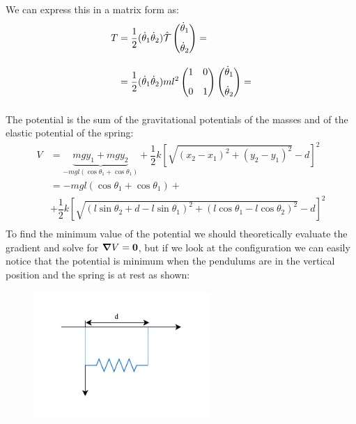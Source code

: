 We can express this in a matrix form as:
\begin{equation}
    \begin{split}
        T &= \dfrac{1}{2}(\dot{\theta}_1 \dot{\theta}_2)\hat{\mathcal{T}}\begin{pmatrix}
            \dot{\theta}_1 \\[8pt]\dot{\theta}_2
        \end{pmatrix} = \\[8pt]
        &= \dfrac{1}{2}(\dot{\theta}_1 \dot{\theta}_2)ml^2\begin{pmatrix}
            1 & 0\\[8pt]
            0 & 1
        \end{pmatrix}
        \begin{pmatrix}
            \dot{\theta}_1 \\[8pt]\dot{\theta}_2
        \end{pmatrix} = \\[8pt]
    \end{split}
\end{equation}
The potential is the sum of the gravitational potentials of the masses and of the elastic potential of the spring:
\begin{equation}
    \begin{split}
        V &= \underbrace{mgy_1 + mgy_2}_{-mgl(\cos\theta_1+\cos\theta_1)} + \dfrac{1}{2}k\left[\sqrt{(x_2-x_1)^2+(y_2-y_1)^2}-d\right]^2\\[8pt]
        &= -mgl(\cos\theta_1+\cos\theta_1) +\\[8pt]
        &+ \dfrac{1}{2}k\left[\sqrt{(l\sin\theta_2+d-l\sin\theta_1)^2+(l\cos\theta_1-l\cos\theta_2)^2}-d\right]^2\\[8pt]
    \end{split}
\end{equation}
To find the minimum value of the potential we should theoretically evaluate the gradient and solve for $\grad V = \vb{0}$, but if we look at the configuration we can easily notice that the potential is minimum when the pendulums are in the vertical position and the spring is at rest as shown:
\begin{figure}[H]
    \centering
    \includegraphics[width=0.6\textwidth]{res/svg/couple_pendulum_still.drawio}
\end{figure}
